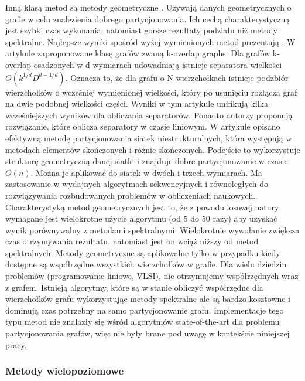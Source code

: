 Inną klasą metod są metody geometryczne
\cite{Miller1994ACP, Raghavan93lineand, 185417, MiTeThVa93, NourOmid1987SolvingFE}.
Używają danych geometrycznych o grafie w celu znalezienia dobrego partycjonowania.
Ich cechą charakterystyczną jest szybki czas wykonania, natomiast gorsze rezultaty podziału niż metody spektralne.
Najlepsze wyniki spośród wyżej wymienionych metod prezentują \cite{185417, MiTeThVa93}.
W artykule \cite{185417} zaproponowane klasę grafów zwaną k-overlap graphs. Dla grafów k-overlap osadzonych w d wymiarach
 \cite{wiki:Graph_embedding} udowadniają istnieje separatora wielkości \(O(k^{1/d}D^{{d-1}/d})\).
Oznacza to, że dla grafu o N wierzchołkach istnieje podzbiór
wierzchołków o wcześniej wymienionej wielkości, który po usunięciu rozłącza graf na dwie podobnej wielkości części.
Wyniki w tym artykule unifikują kilka wcześniejszych wyników dla obliczania separatorów.
Ponadto autorzy proponują rozwiązanie, które oblicza separatory w czasie liniowym.
W artykule \cite{MiTeThVa93} opisano efektywną metodę partycjonowania siatek niestrukturalnych, która występują w metodach
elementów skończonych i różnic skończonych. Podejście to wykorzystuje strukturę geometryczną danej siatki i znajduje
dobre partycjonowanie w czasie \(O(n)\). Można je aplikować do siatek w dwóch i trzech wymiarach. Ma zastosowanie
w wydajnych algorytmach sekwencyjnych i równoległych do rozwiązywania rozbudowanych problemów w obliczeniach naukowych.
Charakterystyką metod geometrycznych jest to, że z powodu losowej natury wymagane jest wielokrotne użycie algorytmu
(od 5 do 50 razy) aby uzyskać wynik porównywalny z metodami spektralnymi.
Wielokrotnie wywołanie zwiększa czas otrzymywania rezultatu, natomiast jest
on wciąż niższy od metod spektralnych. Metody geometryczne są aplikowalne tylko w przypadku kiedy dostępne
są współrzędne wszystkich wierzchołków w grafie. Dla wielu dziedzin problemów (programowanie liniowe, VLSI),
nie otrzymujemy współrzędnych wraz z grafem. Istnieją algorytmy, które są w stanie obliczyć współrzędne dla
wierzchołków grafu \cite{Chan95geometricspectral} wykorzystując metody spektralne ale są bardzo kosztowne i dominują czas potrzebny
na samo partycjonowanie grafu.
Implementacje tego typu metod nie znalazły się wśród algorytmów state-of-the-art dla problemu partycjonowania grafów,
więc nie były brane pod uwagę w kontekście niniejszej pracy.

\newpage

\subsubsection{Metody wielopoziomowe}

